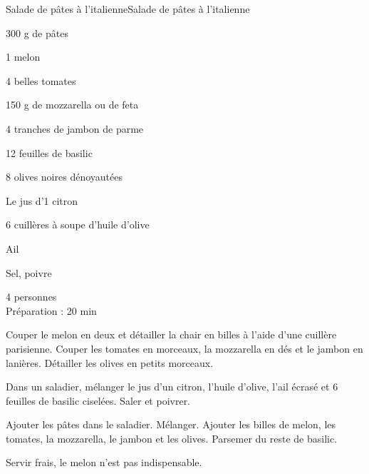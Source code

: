 \begin{recette}{Salade de pâtes à l'italienne}{Salade de pâtes à l'italienne}

\begin{ingredients}
300 g de pâtes\par
1 melon\par
4 belles tomates\par
150 g de mozzarella ou de feta\par
4 tranches de jambon de parme\par
12 feuilles de basilic\par
8 olives noires dénoyautées\par
Le jus d'1 citron\par
6 cuillères à soupe d'huile d'olive\par
Ail\par
Sel, poivre\par
\end{ingredients}

\begin{infos}
4 personnes\\
Préparation : 20 min\\
\end{infos}

\begin{etapes}
\item Couper le melon en deux et détailler la chair en billes à l'aide d'une cuillère parisienne. Couper les tomates en morceaux, la mozzarella en dés et le jambon en lanières. Détailler les olives en petits morceaux.
\item Dans un saladier, mélanger le jus d'un citron, l'huile d'olive, l'ail écrasé et 6 feuilles de basilic ciselées. Saler et poivrer.
\item Ajouter les pâtes dans le saladier. Mélanger. Ajouter les billes de melon, les tomates, la mozzarella, le jambon et les olives. Parsemer du reste de basilic.
\end{etapes}

\begin{conseils}
Servir frais, le melon n'est pas indispensable.
\end{conseils}

\end{recette}